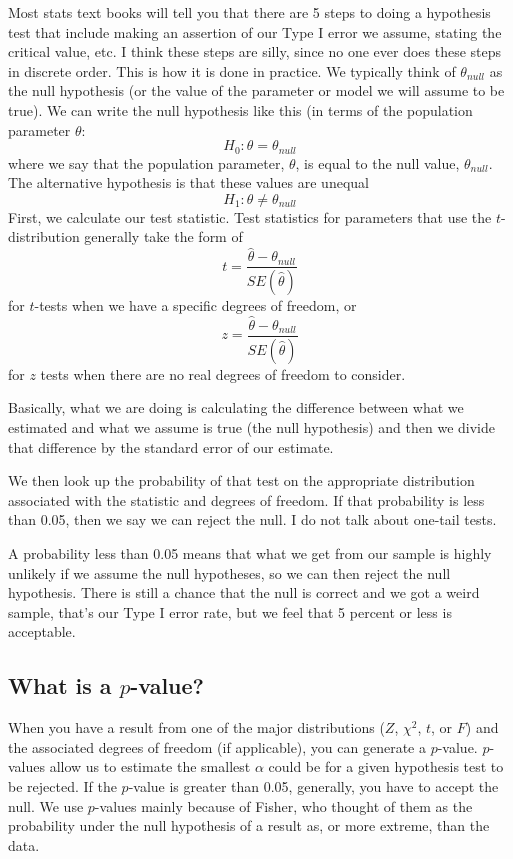 Most stats text books will tell you that there are 5 steps to doing a hypothesis test that include making an assertion of our Type I error we assume, stating the critical value, etc. I think these steps are silly, since no one ever does these steps in discrete order. This is how it is done in practice.
We typically think of $\theta_{null}$ as the null hypothesis (or the value of the parameter or model we will assume to be true). We can write the null hypothesis like this (in terms of the population parameter $\theta$:
\[
H_0:\theta=\theta_{null}
\]
where we say that the population parameter, $\theta$, is equal to the null value, $\theta_{null}$.
The alternative hypothesis is that these values are unequal
\[
H_1:\theta\ne\theta_{null}
\]
First, we calculate our test statistic. Test statistics for parameters that use the $t$-distribution generally take the form of
\begin{equation}
t = \frac{\hat{\theta}-\theta_{null}}{SE\left(\hat{\theta}\right)}
\end{equation}\label{eq:ttest}
for $t$-tests when we have a specific degrees of freedom, or
\begin{equation}\label{eq:ztest}
z = \frac{\hat{\theta}-\theta_{null}}{SE\left(\hat{\theta}\right)}
\end{equation}
for $z$ tests when there are no real degrees of freedom to consider.

Basically, what we are doing is calculating the difference between what we estimated and what we assume is true (the null hypothesis) and then we divide that difference by the standard error of our estimate.

We then look up the probability of that test on the appropriate distribution associated with the statistic and degrees of freedom. If that probability is less than 0.05, then we say we can reject the null. I do not talk about one-tail tests.

A probability less than 0.05 means that what we get from our sample is highly unlikely if we assume the null hypotheses, so we can then reject the null hypothesis. There is still a chance that the null is correct and we got a weird sample, that's our Type I error rate, but we feel that 5 percent or less is acceptable.

\subsection{What is a $p$-value?}

When you have a result from one of the major distributions ($Z$, $\chi^2$, $t$, or $F$) and the associated degrees of freedom (if applicable), you can generate a $p$-value. $p$-values allow us to estimate the smallest $\alpha$ could be for a given hypothesis test to be rejected. If the $p$-value is greater than 0.05, generally, you have to accept the null. We use $p$-values mainly because of Fisher, who thought of them as the probability under the null hypothesis of a result as, or more extreme, than the data.

